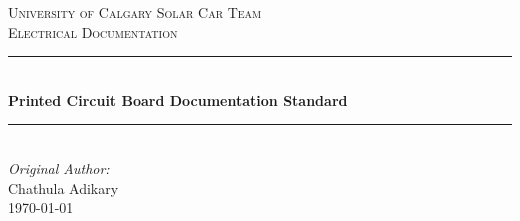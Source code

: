   \begin{titlepage}
  
    \newcommand{\HRule}{\rule{\linewidth}{0.5mm}} %
    
    \center %
     
    
    \textsc{\LARGE University of Calgary Solar Car Team}\\[1.5cm] %
    \textsc{\Large Electrical Documentation}\\[0.5cm] %
    
    
    \HRule \\[0.4cm]
      { \huge \bfseries Printed Circuit Board Documentation Standard}\\[0.4cm] %
    \HRule \\[1.5cm]
     
    
    \Large \emph{Original Author:}\\
    Chathula Adikary\\[3cm] %
    
    
    {\large \today}\\[2cm] %
    
    

\end{titlepage}
